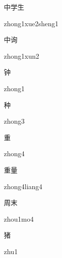 \begin{verbete}{中学生}
\begin{pronuncia}{zhong1xue2sheng1}
\end{pronuncia}
\end{verbete}

\begin{verbete}{中询}
\begin{pronuncia}{zhong1xun2}
\end{pronuncia}
\end{verbete}

\begin{verbete}[zhong1]{钟}
\begin{pronuncia}{zhong1}
\end{pronuncia}
\end{verbete}

\begin{verbete}[zhong3]{种}
\begin{pronuncia}{zhong3}
\end{pronuncia}
\end{verbete}

\begin{verbete}[zhong4]{重}
\begin{pronuncia}{zhong4}
\end{pronuncia}
\end{verbete}

\begin{verbete}{重量}
\begin{pronuncia}{zhong4liang4}
\end{pronuncia}
\end{verbete}

\begin{verbete}[zhou1mo4]{周末}
\begin{pronuncia}{zhou1mo4}
\end{pronuncia}
\end{verbete}

\begin{verbete}[zhu1]{猪}
\begin{pronuncia}{zhu1}
\end{pronuncia}
\end{verbete}

